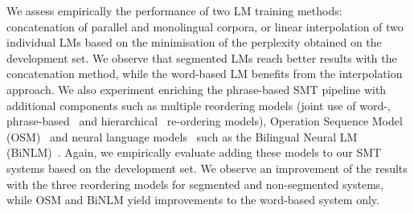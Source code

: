 \documentclass[free]{flammie}
\begin{document}
We assess empirically the performance of two LM training methods: concatenation of parallel and monolingual corpora, or linear interpolation of two individual LMs based on the minimisation of the perplexity obtained on the development set. We observe that segmented LMs reach better results with the concatenation method, while the word-based LM benefits from the interpolation approach.
We also experiment enriching the phrase-based SMT pipeline with additional components such as multiple reordering models (joint use of word-, phrase-based~\cite{koehn2005edinburgh} and hierarchical~\cite{galley2008simple} re-ordering models), Operation Sequence Model (OSM)~\cite{durrani2011joint} and neural language models~\cite{vaswani2013decoding} such as the Bilingual Neural LM (BiNLM)~\cite{devlin2014fast}.
Again, we empirically evaluate adding these models to our SMT systems based on the development set. We observe an improvement of the results with the three reordering models for segmented and non-segmented systems, while OSM and BiNLM yield improvements to the word-based system only.%
\end{document}
